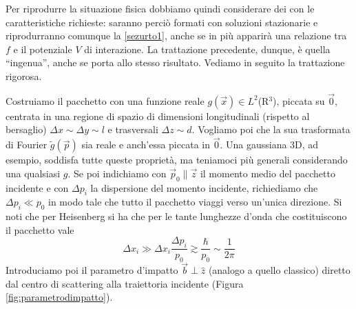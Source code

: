 \documentclass[../../FisicaTeorica.tex]{subfiles}
\begin{document}
Per riprodurre la situazione fisica dobbiamo quindi considerare dei
 con le caratteristiche richieste: saranno
perci{\`o} formati con soluzioni stazionarie e riprodurranno comunque la
{\eqref{sezurto1}}, anche se in pi{\`u} apparir{\`a} una relazione tra $f$ e
il potenziale $V$ di interazione. La trattazione precedente, dunque, {\`e}
quella ``ingenua'', anche se porta allo stesso risultato. Vediamo in seguito
la trattazione rigorosa.

Costruiamo il pacchetto con una funzione reale $g (\vec{x}) \in L^2$(R$^3$),
piccata su $\vec{0}$, centrata in una regione di spazio di dimensioni
longitudinali (rispetto al bersaglio) $\Delta x \sim \Delta y \sim l$ e
trasversali $\Delta z \sim d$. Vogliamo poi che la sua trasformata di Fourier
$\tilde{g} (\vec{p})$ sia reale e anch'essa piccata in $\vec{0}$. Una
gaussiana 3D, ad esempio, soddisfa tutte queste propriet{\`a}, ma teniamoci
pi{\`u} generali considerando una qualsiasi $g$. Se poi indichiamo con
$\vec{p}_0 \parallel \vec{z}$ il momento medio del pacchetto incidente e con
$\Delta p_i$ la dispersione del momento incidente, richiediamo che $\Delta p_i
\ll p_0$ in modo tale che tutto il pacchetto viaggi verso un'unica direzione.
Si noti che per Heisenberg si ha che per le tante lunghezze d'onda che costituiscono il pacchetto vale
\[ \Delta x_i \gg \Delta x_i  \frac{\Delta p_i}{p_0} \gtrsim \frac{\hbar}{p_0}
   \sim \frac{1}{2 \pi} \]
Introduciamo poi il parametro d'impatto $\vec{b} \perp \hat{z}$ (analogo a
quello classico) diretto dal centro di scattering alla traiettoria incidente
(Figura \ref{fig:parametrodimpatto}).
\end{document}
